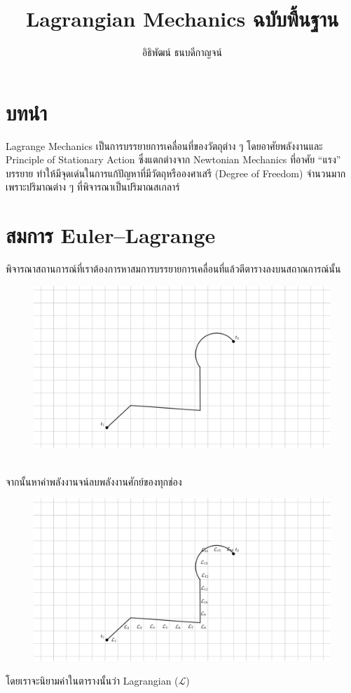 \documentclass[a4paper,12pt]{article}
\title{Lagrangian Mechanics ฉบับพื้นฐาน}
\author{อิธิพัฒน์ ธนบดีกาญจน์}
\begin{document}
\renewcommand{\thefootnote}{\fnsymbol{footnote}}

\maketitle

\section{บทนำ}
Lagrange Mechanics เป็นการบรรยายการเคลื่อนที่ของวัตถุต่าง ๆ โดยอาศัยพลังงานและ Principle of Stationary Action ซึ่งแตกต่างจาก Newtonian Mechanics ที่อาศัย “แรง” บรรยาย ทำให้มีจุดเด่นในการแก้ปัญหาที่มีวัตถุหรือองศาเสรี (Degree of Freedom) จำนวนมากเพราะปริมาณต่าง ๆ ที่พิจารณาเป็นปริมาณสเกลาร์

\section{สมการ Euler–Lagrange}
พิจารณาสถานการณ์ที่เราต้องการหาสมการบรรยายการเคลื่อนที่แล้วตีตารางลงบนสถาณการณ์นั้น
\begin{figure}[h]
	\centering
	\includegraphics[width=0.7\linewidth]{path}
	\label{fig:path}
\end{figure}
\\จากนั้นหาค่าพลังงานจน์ลบพลังงานศักย์ของทุกช่อง
\begin{figure}[h]
	\centering
	\includegraphics[width=0.7\linewidth]{path_lagrangian}
	\label{fig:pathlagrangian}
\end{figure}
โดยเราจะนิยามค่าในตารางนั้นว่า Lagrangian (\(\mathcal{L}\))
\end{document}
